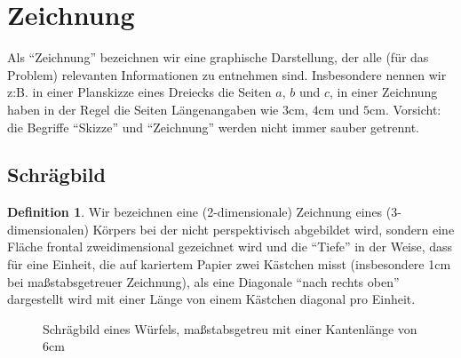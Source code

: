 \documentclass[a4paper]{book}%
\def\width{12}
\def\hauteur{12}
\theoremstyle{definition}
\newtheorem{definition}{Definition}
\begin{document}
\section{Zeichnung}

Als \enquote{Zeichnung} bezeichnen wir eine graphische Darstellung, der alle (für das Problem) relevanten Informationen zu entnehmen sind. Insbesondere nennen wir z:B. in einer Planskizze eines Dreiecks die Seiten $a$, $b$ und $c$, in einer Zeichnung haben in der Regel die Seiten Längenangaben wie $3 \text{cm}$, $4 \text{cm}$ und $5 \text{cm}$. Vorsicht: die Begriffe \enquote{Skizze} und \enquote{Zeichnung} werden nicht immer sauber getrennt.


\subsection{Schrägbild}\label{Schrägbild}

\begin{definition}
    Wir bezeichnen eine (2-dimensionale) Zeichnung eines (3-dimensionalen) Körpers bei der nicht perspektivisch abgebildet wird, sondern eine Fläche frontal zweidimensional gezeichnet wird und die \enquote{Tiefe} in der Weise, dass für eine Einheit, die auf kariertem Papier zwei Kästchen misst (insbesondere 1cm bei maßstabsgetreuer Zeichnung), als eine Diagonale \enquote{nach rechts oben} dargestellt wird mit einer Länge von einem Kästchen diagonal pro Einheit.
\end{definition}

\begin{figure}
  \centering
  \caption{Schrägbild eines Würfels, maßstabsgetreu mit einer Kantenlänge von 6cm}\label{fig:SchraegbildWuerfel}
\end{figure}
\end{document}
